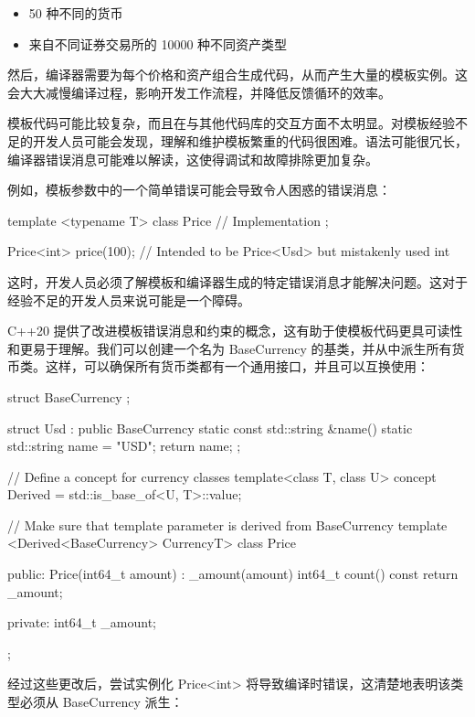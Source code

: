 \begin{itemize}
\item
50 种不同的货币

\item
来自不同证券交易所的 10000 种不同资产类型
\end{itemize}

然后，编译器需要为每个价格和资产组合生成代码，从而产生大量的模板实例。这会大大减慢编译过程，影响开发工作流程，并降低反馈循环的效率。


模板代码可能比较复杂，而且在与其他代码库的交互方面不太明显。对模板经验不足的开发人员可能会发现，理解和维护模板繁重的代码很困难。语法可能很冗长，编译器错误消息可能难以解读，这使得调试和故障排除更加复杂。

例如，模板参数中的一个简单错误可能会导致令人困惑的错误消息：

\begin{cpp}
template <typename T>
class Price {
    // Implementation
};

Price<int> price(100); // Intended to be Price<Usd> but mistakenly used int
\end{cpp}

这时，开发人员必须了解模板和编译器生成的特定错误消息才能解决问题。这对于经验不足的开发人员来说可能是一个障碍。

C++20 提供了改进模板错误消息和约束的概念，这有助于使模板代码更具可读性和更易于理解。我们可以创建一个名为 BaseCurrency 的基类，并从中派生所有货币类。这样，可以确保所有货币类都有一个通用接口，并且可以互换使用：

\begin{cpp}
struct BaseCurrency {
};

struct Usd : public BaseCurrency {
    static const std::string &name() {
        static std::string name = "USD";
        return name;
    }
};

// Define a concept for currency classes
template<class T, class U>
concept Derived = std::is_base_of<U, T>::value;

// Make sure that template parameter is derived from BaseCurrency
template <Derived<BaseCurrency> CurrencyT>
class Price {
public:
    Price(int64_t amount) : _amount(amount) {}
    int64_t count() const { return _amount; }

private:
    int64_t _amount;
};
\end{cpp}

经过这些更改后，尝试实例化 Price<int> 将导致编译时错误，这清楚地表明该类型必须从 BaseCurrency 派生：

